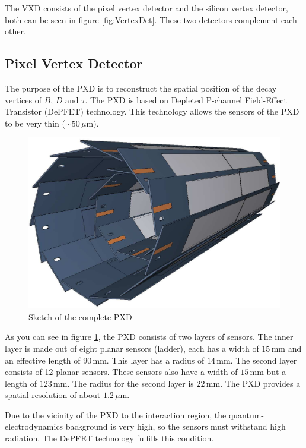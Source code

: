 \documentclass[a4paper,11pt,twosided,final,german,openbib,pdftex,listof=totoc,bibliography=totoc]{scrbook}
\begin{document}
The VXD consists of the pixel vertex detector and the silicon vertex detector, both can be seen in figure \ref{fig:VertexDet}. These two detectors complement each other.


\subsection{Pixel Vertex Detector}
\label{sec:Pixel}
The purpose of the PXD is to reconstruct the spatial position of the decay vertices of $B$, $D$ and $\tau$.
The PXD is based on Depleted P-channel Field-Effect Transistor (DePFET) technology. This technology allows the sensors of the PXD to be very thin ($\sim 50\,\mu\textrm{m}$).

\begin{figure}[h!]
	\begin{center}
		\includegraphics[width=12cm]{Bilder/pixel}
	\end{center}
	\caption[Pixel Detector]{Sketch of the complete PXD \cite{B2TR}}
	\label{fig:pxd}
\end{figure}

As you can see in figure \ref{fig:pxd}, the PXD consists of two layers of sensors. The inner layer is made out of eight planar sensors (ladder), each has a width of $15\,\textrm{mm}$ and an effective length of $90\,\textrm{mm}$. This layer has a radius of $14\,\textrm{mm}$. The second layer consists of 12 planar sensors. These sensors also have a width of $15\,\textrm{mm}$ but a length of $123\,\textrm{mm}$. The radius for the second layer is $22\,\textrm{mm}$. The PXD provides a spatial resolution of about $1.2\,\mu\textrm{m}$.\cite{B2TR}

Due to the vicinity of the PXD to the interaction region, the quantum-electrodynamics background is very high, so the sensors must withstand high radiation. The DePFET technology fulfills this condition. \cite{B2TR} \cite{MARINAS201159}
\newline 
\end{document}
